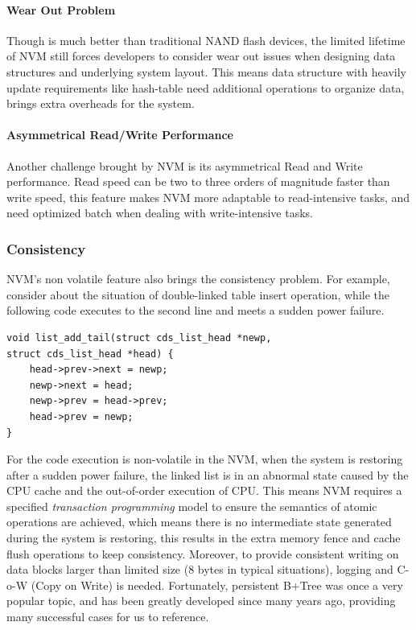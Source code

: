 \paragraph{Wear Out Problem}
Though is much better than traditional NAND flash devices, the limited lifetime of NVM still forces developers to consider wear out issues when designing data structures and underlying system layout\cite{dulloor2014system,van2018managing}. This means data structure with heavily update requirements like hash-table need additional operations to organize data, brings extra overheads for the system. 

\paragraph{Asymmetrical Read/Write Performance}
Another challenge brought by NVM is its asymmetrical Read and Write performance\cite{wu2017early}. Read speed can be two to three orders of magnitude faster than write speed, this feature makes NVM more adaptable to read-intensive tasks, and need optimized batch when dealing with write-intensive tasks.

\subsubsection{Consistency}\label{sec:8bytes-law}

NVM's non volatile feature also brings the consistency problem. For example, consider about the situation of double-linked table insert operation, while the following code executes to the second line and meets a sudden power failure.
\begin{verbatim}
void list_add_tail(struct cds_list_head *newp,
struct cds_list_head *head) {
	head->prev->next = newp;
	newp->next = head;
	newp->prev = head->prev;
	head->prev = newp;
}
\end{verbatim}
For the code execution is non-volatile in the NVM, when the system is restoring after a sudden power failure, the linked list is in an abnormal state caused by the CPU cache and the out-of-order execution of CPU. This means NVM requires a specified \textit{transaction programming} model\cite{volos2011mnemosyne,dulloor2014system,ren2015thynvm,188438} to ensure the semantics of atomic operations are achieved, which means there is no intermediate state generated during the system is restoring, this results in the extra memory fence and cache flush operations to keep consistency. Moreover, to provide consistent writing on data blocks larger than limited size (8 bytes in typical situations), logging and C-o-W (Copy on Write) is needed. Fortunately, persistent B+Tree\cite{188438,oukid2016fptree} was once a very popular topic, and has been greatly developed since many years ago, providing many successful cases for us to reference.

